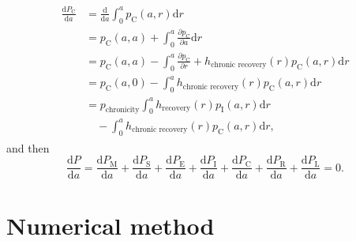 \documentclass[12pt]{article}
\newcommand{\md}{\mathrm{d}}
\begin{document}
\begin{align}
\begin{split}
    \frac{\md P_{\mathrm{C}}}{\md a}
    &= \frac{\md}{\md a}  \int_0^a p_{\mathrm{C}}(a, r) \md r
    \\
    &= p_{\mathrm{C}}(a, a)
    + \int_0^a \frac{\partial p_{\mathrm{C}}}{\partial a} \md r
    \\
    &= p_{\mathrm{C}}(a, a)
    - \int_0^a \frac{\partial p_{\mathrm{C}}}{\partial r}
    + h_{\text{chronic recovery}}(r) p_{\mathrm{C}}(a, r) \md r
    \\
    &= p_{\mathrm{C}}(a, 0)
    - \int_0^a h_{\text{chronic recovery}}(r) p_{\mathrm{C}}(a, r) \md r
    \\
    &= p_{\text{chronicity}}
    \int_0^a h_{\text{recovery}}(r) p_{\mathrm{I}}(a, r) \md r
    \\ & \quad {}
    - \int_0^a h_{\text{chronic recovery}}(r) p_{\mathrm{C}}(a, r) \md r,
  \end{split}
\end{align}
and then
\begin{equation}
  \frac{\md P}{\md a} =
  \frac{\md P_{\mathrm{M}}}{\md a}
  + \frac{\md P_{\mathrm{S}}}{\md a}
  + \frac{\md P_{\mathrm{E}}}{\md a}
  + \frac{\md P_{\mathrm{I}}}{\md a}
  + \frac{\md P_{\mathrm{C}}}{\md a}
  + \frac{\md P_{\mathrm{R}}}{\md a}
  + \frac{\md P_{\mathrm{L}}}{\md a}
  = 0.
\end{equation}


\section{Numerical method}
\end{document}
